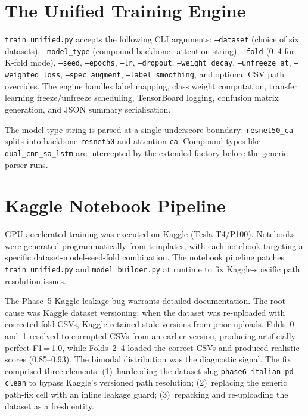\documentclass[oneside,openany]{final_report}
\begin{document}
\section{The Unified Training Engine}

\texttt{train\_unified.py} accepts the following CLI arguments: \texttt{--dataset} (choice of six datasets), \texttt{--model\_type} (compound backbone\_attention string), \texttt{--fold} (0--4 for K-fold mode), \texttt{--seed}, \texttt{--epochs}, \texttt{--lr}, \texttt{--dropout}, \texttt{--weight\_decay}, \texttt{--unfreeze\_at}, \texttt{--weighted\_loss}, \texttt{--spec\_augment}, \texttt{--label\_smoothing}, and optional CSV path overrides. The engine handles label mapping, class weight computation, transfer learning freeze/unfreeze scheduling, TensorBoard logging, confusion matrix generation, and JSON summary serialisation.

The model type string is parsed at a single underscore boundary: \texttt{resnet50\_ca} splits into backbone \texttt{resnet50} and attention \texttt{ca}. Compound types like \texttt{dual\_cnn\_sa\_lstm} are intercepted by the extended factory before the generic parser runs.

\section{Kaggle Notebook Pipeline}

GPU-accelerated training was executed on Kaggle (Tesla T4/P100). Notebooks were generated programmatically from templates, with each notebook targeting a specific dataset-model-seed-fold combination. The notebook pipeline patches \texttt{train\_unified.py} and \texttt{model\_builder.py} at runtime to fix Kaggle-specific path resolution issues.

The Phase~5 Kaggle leakage bug warrants detailed documentation. The root cause was Kaggle dataset versioning: when the dataset was re-uploaded with corrected fold CSVs, Kaggle retained stale versions from prior uploads. Folds~0 and~1 resolved to corrupted CSVs from an earlier version, producing artificially perfect F1\,=\,1.0, while Folds~2--4 loaded the correct CSVs and produced realistic scores (0.85--0.93). The bimodal distribution was the diagnostic signal. The fix comprised three elements: (1)~hardcoding the dataset slug \texttt{phase6-italian-pd-clean} to bypass Kaggle's versioned path resolution; (2)~replacing the generic path-fix cell with an inline leakage guard; (3)~repacking and re-uploading the dataset as a fresh entity.
\end{document}
